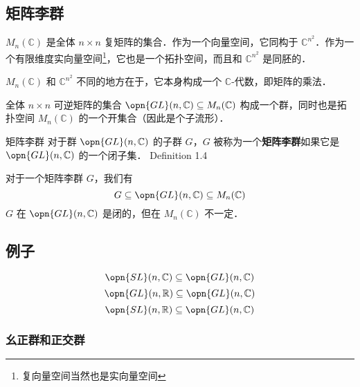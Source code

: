 
\begin{issues}
\issueDraft
\end{issues}


\subsection{矩阵李群}

$M_n(\mathbb{C})$ 是全体 $n \times n$ 复矩阵的集合．作为一个向量空间，它同构于 $\mathbb{C}^{n^2}$．作为一个有限维度实向量空间\footnote{复向量空间当然也是实向量空间}，它也是一个拓扑空间，而且和 $\mathbb{C}^{n^2}$ 是同胚的．

$M_n(\mathbb{C})$ 和 $\mathbb{C}^{n^2}$ 不同的地方在于，它本身构成一个 $\mathbb{C}$-代数，即矩阵的乘法．


全体 $n \times n$ 可逆矩阵的集合 $\opn{GL}(n, \mathbb{C}) \subseteq M_n(\mathbb{C})$ 构成一个群，同时也是拓扑空间 $M_n(\mathbb{C})$ 的一个开集合（因此是个子流形）．

\begin{definition}{矩阵李群}
对于群 $\opn{GL}(n, \mathbb{C})$ 的子群 $G$，$G$ 被称为一个\textbf{矩阵李群}如果它是 $\opn{GL}(n, \mathbb{C})$ 的一个闭子集． Definition 1.4 \cite{GTM222} 
\end{definition}

对于一个矩阵李群 $G$，我们有
$$
G \subseteq \opn{GL}(n, \mathbb{C}) \subseteq M_n(\mathbb{C})
$$
$G$ 在 $\opn{GL}(n, \mathbb{C})$ 是闭的，但在 $M_n(\mathbb{C})$ 不一定．

\subsection{例子}

\begin{example}{}
$$\opn{SL}(n, \mathbb{C}) \subseteq \opn{GL}(n, \mathbb{C})$$
$$\opn{GL}(n, \mathbb{R}) \subseteq \opn{GL}(n, \mathbb{C})$$
$$\opn{SL}(n, \mathbb{R}) \subseteq \opn{GL}(n, \mathbb{C})$$
\end{example}

\subsubsection{幺正群和正交群}
